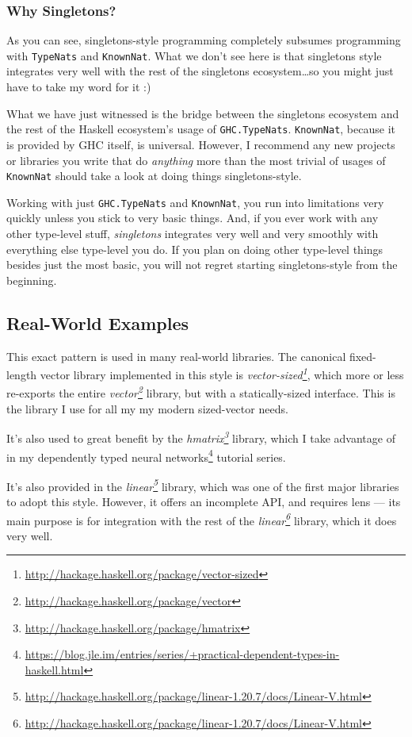 \documentclass[]{article}
\renewcommand{\href}[2]{#2\footnote{\url{#1}}}
\begin{document}
\subsubsection{Why Singletons?}\label{why-singletons}

As you can see, singletons-style programming completely subsumes programming
with \texttt{TypeNats} and \texttt{KnownNat}. What we don't see here is that
singletons style integrates very well with the rest of the singletons
ecosystem\ldots so you might just have to take my word for it :)

What we have just witnessed is the bridge between the singletons ecosystem and
the rest of the Haskell ecosystem's usage of \texttt{GHC.TypeNats}.
\texttt{KnownNat}, because it is provided by GHC itself, is universal. However,
I recommend any new projects or libraries you write that do \emph{anything} more
than the most trivial of usages of \texttt{KnownNat} should take a look at doing
things singletons-style.

Working with just \texttt{GHC.TypeNats} and \texttt{KnownNat}, you run into
limitations very quickly unless you stick to very basic things. And, if you ever
work with any other type-level stuff, \emph{singletons} integrates very well and
very smoothly with everything else type-level you do. If you plan on doing other
type-level things besides just the most basic, you will not regret starting
singletons-style from the beginning.

\subsection{Real-World Examples}\label{real-world-examples}

This exact pattern is used in many real-world libraries. The canonical
fixed-length vector library implemented in this style is
\emph{\href{http://hackage.haskell.org/package/vector-sized}{vector-sized}},
which more or less re-exports the entire
\emph{\href{http://hackage.haskell.org/package/vector}{vector}} library, but
with a statically-sized interface. This is the library I use for all my my
modern sized-vector needs.

It's also used to great benefit by the
\emph{\href{http://hackage.haskell.org/package/hmatrix}{hmatrix}} library, which
I take advantage of in my
\href{https://blog.jle.im/entries/series/+practical-dependent-types-in-haskell.html}{dependently
typed neural networks} tutorial series.

It's also provided in the
\emph{\href{http://hackage.haskell.org/package/linear-1.20.7/docs/Linear-V.html}{linear}}
library, which was one of the first major libraries to adopt this style.
However, it offers an incomplete API, and requires lens --- its main purpose is
for integration with the rest of the
\emph{\href{http://hackage.haskell.org/package/linear-1.20.7/docs/Linear-V.html}{linear}}
library, which it does very well.
\end{document}
